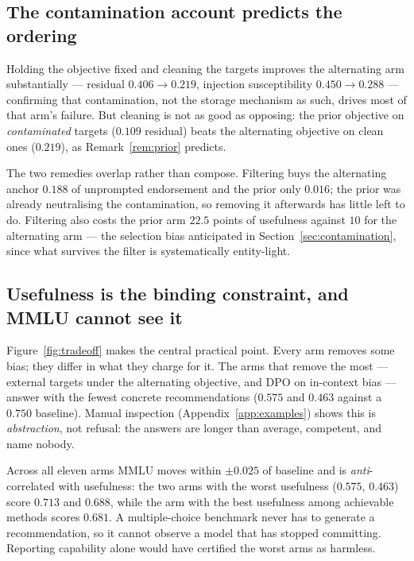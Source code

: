\documentclass{article}
\begin{document}
\subsection{The contamination account predicts the ordering}

Holding the objective fixed and cleaning the targets improves the alternating
arm substantially --- residual $0.406 \to 0.219$, injection susceptibility $0.450 \to 0.288$
--- confirming that contamination, not the storage mechanism as such, drives
most of that arm's failure. But cleaning is not as good as opposing: the prior
objective on \emph{contaminated} targets ($0.109$ residual) beats the
alternating objective on clean ones ($0.219$), as Remark~\ref{rem:prior}
predicts.

The two remedies overlap rather than compose. Filtering buys the alternating
anchor $0.188$ of unprompted endorsement and the prior only $0.016$; the prior was
already neutralising the contamination, so removing it afterwards has little
left to do. Filtering also costs the prior arm $22.5$ points of usefulness
against $10$ for the alternating arm --- the selection bias anticipated in
Section~\ref{sec:contamination}, since what survives the filter is
systematically entity-light.

\subsection{Usefulness is the binding constraint, and MMLU cannot see it}

Figure~\ref{fig:tradeoff} makes the central practical point. Every arm removes
some bias; they differ in what they charge for it. The arms that remove the most
--- external targets under the alternating objective, and DPO on in-context bias
--- answer with the fewest concrete recommendations ($0.575$ and $0.463$ against
a $0.750$ baseline). Manual inspection (Appendix~\ref{app:examples}) shows this
is \emph{abstraction}, not refusal: the answers are longer than average,
competent, and name nobody.

Across all eleven arms MMLU moves within $\pm 0.025$ of baseline and is
\emph{anti}-correlated with usefulness: the two arms with the worst usefulness
($0.575$, $0.463$) score $0.713$ and $0.688$, while the arm with the best
usefulness among achievable methods scores $0.681$. A multiple-choice benchmark
never has to generate a recommendation, so it cannot observe a model that has
stopped committing. Reporting capability alone would have certified the worst
arms as harmless.
\end{document}
